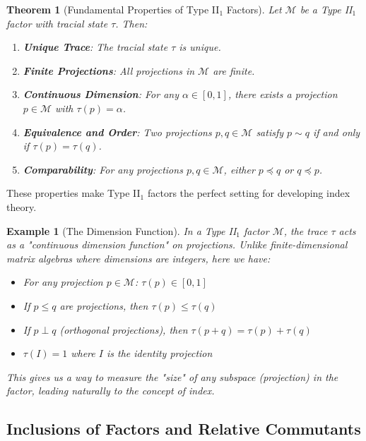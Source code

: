 \documentclass[11pt, a4paper]{article}
\theoremstyle{colored_def}
\theoremstyle{colored_thm}
\newtheorem{theorem}{Theorem}[section]
\theoremstyle{colored_ex}
\newtheorem{example}{Example}[section]
\newcommand{\M}{\mathcal{M}}
\begin{document}
\begin{theorem}[Fundamental Properties of Type II$_1$ Factors]
Let $\M$ be a Type II$_1$ factor with tracial state $\tau$. Then:
\begin{enumerate}
    \item \textbf{Unique Trace}: The tracial state $\tau$ is unique.
    \item \textbf{Finite Projections}: All projections in $\M$ are finite.
    \item \textbf{Continuous Dimension}: For any $\alpha \in [0,1]$, there exists a projection $p \in \M$ with $\tau(p) = \alpha$.
    \item \textbf{Equivalence and Order}: Two projections $p, q \in \M$ satisfy $p \sim q$ if and only if $\tau(p) = \tau(q)$.
    \item \textbf{Comparability}: For any projections $p, q \in \M$, either $p \preccurlyeq q$ or $q \preccurlyeq p$.
\end{enumerate}
\end{theorem}

These properties make Type II$_1$ factors the perfect setting for developing index theory.

\begin{example}[The Dimension Function]\label{ex:dimension-function}
In a Type II$_1$ factor $\M$, the trace $\tau$ acts as a "continuous dimension function" on projections. Unlike finite-dimensional matrix algebras where dimensions are integers, here we have:

\begin{itemize}
    \item For any projection $p \in \M$: $\tau(p) \in [0,1]$
    \item If $p \leq q$ are projections, then $\tau(p) \leq \tau(q)$
    \item If $p \perp q$ (orthogonal projections), then $\tau(p + q) = \tau(p) + \tau(q)$
    \item $\tau(I) = 1$ where $I$ is the identity projection
\end{itemize}

This gives us a way to measure the "size" of any subspace (projection) in the factor, leading naturally to the concept of index.
\end{example}

\subsection{Inclusions of Factors and Relative Commutants}
\end{document}
